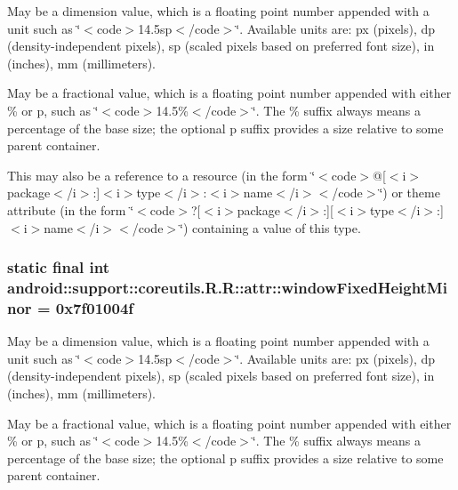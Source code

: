 May be a dimension value, which is a floating point number appended with a unit such as \char`\"{}$<$code$>$14.5sp$<$/code$>$\char`\"{}. Available units are: px (pixels), dp (density-independent pixels), sp (scaled pixels based on preferred font size), in (inches), mm (millimeters). 

May be a fractional value, which is a floating point number appended with either \% or p, such as \char`\"{}$<$code$>$14.5\%$<$/code$>$\char`\"{}. The \% suffix always means a percentage of the base size; the optional p suffix provides a size relative to some parent container. 

This may also be a reference to a resource (in the form \char`\"{}$<$code$>$@\mbox{[}$<$i$>$package$<$/i$>$:\mbox{]}$<$i$>$type$<$/i$>$:$<$i$>$name$<$/i$>$$<$/code$>$\char`\"{}) or theme attribute (in the form \char`\"{}$<$code$>$?\mbox{[}$<$i$>$package$<$/i$>$:\mbox{]}\mbox{[}$<$i$>$type$<$/i$>$:\mbox{]}$<$i$>$name$<$/i$>$$<$/code$>$\char`\"{}) containing a value of this type. \hypertarget{classandroid_1_1support_1_1coreutils_1_1_r_1_1attr_0d83b2b7061cd1ad506627cc84dcc399}{
\subsubsection[{windowFixedHeightMinor}]{\setlength{\rightskip}{0pt plus 5cm}static final int android::support::coreutils.R.R::attr::windowFixedHeightMinor = 0x7f01004f}}
\label{classandroid_1_1support_1_1coreutils_1_1_r_1_1attr_0d83b2b7061cd1ad506627cc84dcc399}


May be a dimension value, which is a floating point number appended with a unit such as \char`\"{}$<$code$>$14.5sp$<$/code$>$\char`\"{}. Available units are: px (pixels), dp (density-independent pixels), sp (scaled pixels based on preferred font size), in (inches), mm (millimeters). 

May be a fractional value, which is a floating point number appended with either \% or p, such as \char`\"{}$<$code$>$14.5\%$<$/code$>$\char`\"{}. The \% suffix always means a percentage of the base size; the optional p suffix provides a size relative to some parent container. 


